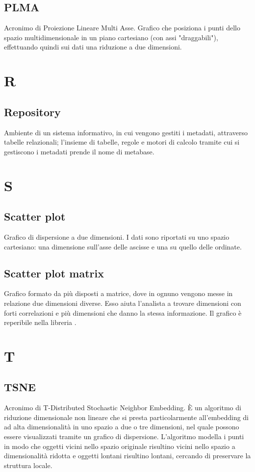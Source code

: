 \subsection*{PLMA}
Acronimo di Proiezione Lineare Multi Asse. Grafico che posiziona i punti dello spazio multidimensionale in un piano cartesiano (con assi "draggabili"), effettuando quindi sui dati una riduzione a due dimensioni.

\section*{R}

\subsection*{Repository}
Ambiente di un sistema informativo, in cui vengono gestiti i metadati, attraverso tabelle relazionali; l'insieme di tabelle, regole e motori di calcolo tramite cui si gestiscono i metadati prende il nome di metabase.

\section*{S}

\subsection*{Scatter plot}
Grafico di dispersione a due dimensioni. I dati sono riportati su uno spazio cartesiano: una dimensione sull'asse delle ascisse e una su quello delle ordinate.

\subsection*{Scatter plot matrix}
Grafico formato da più  disposti a matrice, dove in ognuno vengono messe in relazione due dimensioni diverse. Esso aiuta l'analista a trovare dimensioni con forti correlazioni e più  dimensioni che danno la stessa informazione. Il grafico è reperibile nella libreria .

\section*{T}

\subsection*{TSNE}
Acronimo di T-Distributed Stochastic Neighbor Embedding. È un algoritmo di riduzione dimensionale non lineare che si presta particolarmente all'embedding di  ad alta dimensionalità in uno spazio a due o tre dimensioni, nel quale possono essere visualizzati tramite un grafico di dispersione. L'algoritmo modella i punti in modo che oggetti vicini nello spazio originale risultino vicini nello spazio a dimensionalità ridotta e oggetti lontani risultino lontani, cercando di preservare la struttura locale.

